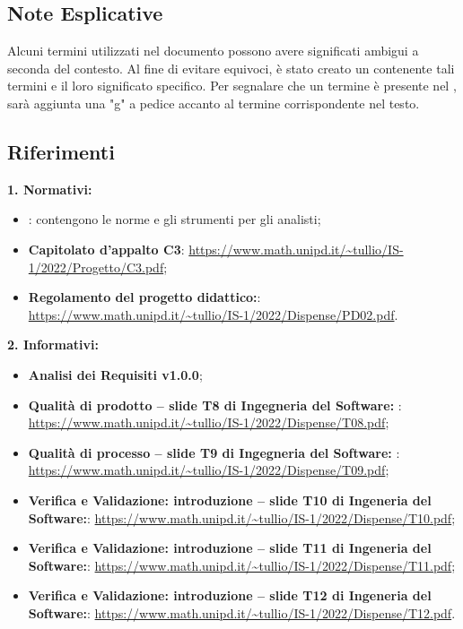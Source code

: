 \subsection{Note Esplicative}
Alcuni termini utilizzati nel documento possono avere significati ambigui a seconda del contesto. Al fine di evitare equivoci, è stato creato un \Glodocumento contenente tali termini 
e il loro significato specifico. Per segnalare che un termine è presente nel \Glodocumento, sarà aggiunta una "g" a pedice accanto al termine corrispondente nel testo.

\subsection{Riferimenti}
\textbf{1. Normativi:} 
\begin{itemize}
    \item \textbf{\NdPdocumento}: contengono le norme e gli strumenti per gli analisti;
    \item \textbf{Capitolato d’appalto C3}: \url{https://www.math.unipd.it/~tullio/IS-1/2022/Progetto/C3.pdf};
    \item \textbf{Regolamento del progetto didattico:}: \url{https://www.math.unipd.it/~tullio/IS-1/2022/Dispense/PD02.pdf}.
\end{itemize}

\textbf{2. Informativi:} 
\begin{itemize}
    \item \textbf{Analisi dei Requisiti v1.0.0};
    \item \textbf{Qualità di prodotto – slide T8 di Ingegneria del Software: }: \url{https://www.math.unipd.it/~tullio/IS-1/2022/Dispense/T08.pdf};
    \item \textbf{Qualità di processo – slide T9 di Ingegneria del Software: }: \url{https://www.math.unipd.it/~tullio/IS-1/2022/Dispense/T09.pdf};
    \item \textbf{Verifica e Validazione: introduzione – slide T10 di Ingeneria del Software:}: \url{https://www.math.unipd.it/~tullio/IS-1/2022/Dispense/T10.pdf};
    \item \textbf{Verifica e Validazione: introduzione – slide T11 di Ingeneria del Software:}: \url{https://www.math.unipd.it/~tullio/IS-1/2022/Dispense/T11.pdf};
    \item \textbf{Verifica e Validazione: introduzione – slide T12 di Ingeneria del Software:}: \url{https://www.math.unipd.it/~tullio/IS-1/2022/Dispense/T12.pdf}.

\end{itemize}

